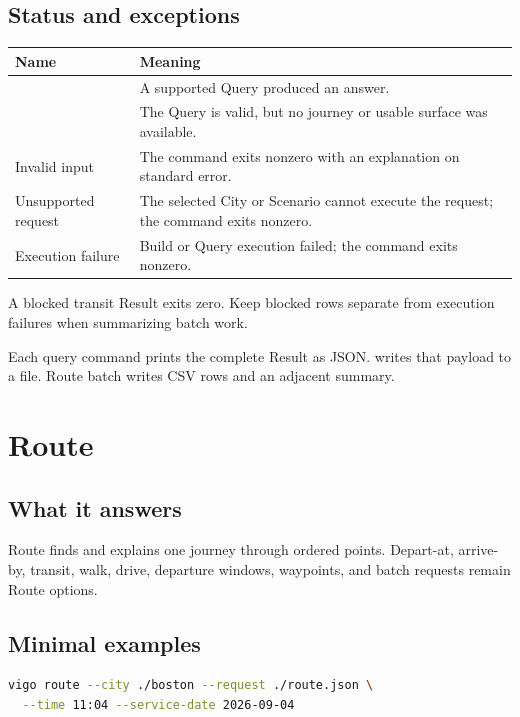 \documentclass[10pt,letterpaper]{article}
\begin{document}
\subsection{Status and exceptions}

\begin{center}
\begin{tabularx}{\linewidth}{P{1.35in} Y}
\toprule
\textbf{Name} & \textbf{Meaning} \\
\midrule
{} & A supported Query produced an answer. \\
 & The Query is valid, but no journey or usable surface was available. \\
Invalid input & The command exits nonzero with an explanation on standard error. \\
Unsupported request & The selected City or Scenario cannot execute the request; the command exits nonzero. \\
Execution failure & Build or Query execution failed; the command exits nonzero. \\
\bottomrule
\end{tabularx}
\end{center}

A blocked transit Result exits zero. Keep blocked rows separate from execution failures when summarizing batch work.

Each query command prints the complete Result as JSON.  writes that payload to a file. Route batch writes CSV rows and an adjacent summary.

\section{Route}

\subsection{What it answers}

Route finds and explains one journey through ordered points. Depart-at, arrive-by, transit, walk, drive, departure windows, waypoints, and batch requests remain Route options.

\subsection{Minimal examples}

\begin{lstlisting}[language=bash]
vigo route --city ./boston --request ./route.json \
  --time 11:04 --service-date 2026-09-04
\end{lstlisting}
\end{document}
